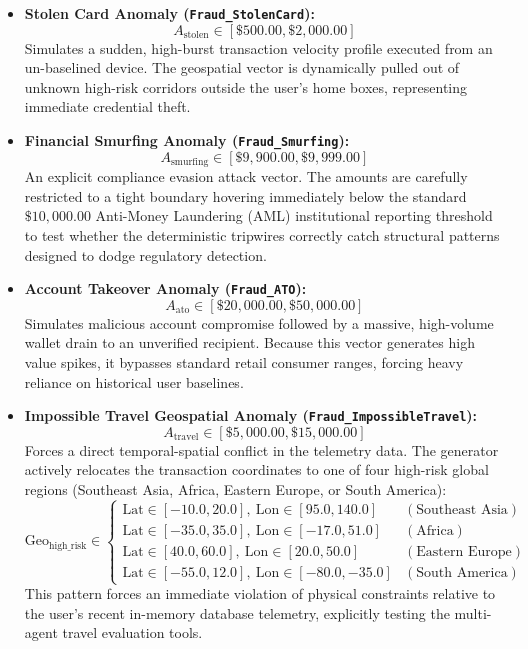 \documentclass[12pt]{report}
\begin{document}
\begin{itemize}
    \item \textbf{Stolen Card Anomaly (\texttt{Fraud\_StolenCard}):}
    $$
        A_{\text{stolen}} \in [\$500.00, \$2,000.00]
    $$
    Simulates a sudden, high-burst transaction velocity profile executed from an un-baselined device. The geospatial vector is dynamically pulled out of unknown high-risk corridors outside the user's home boxes, representing immediate credential theft.
    
    \item \textbf{Financial Smurfing Anomaly (\texttt{Fraud\_Smurfing}):}
    $$
        A_{\text{smurfing}} \in [\$9,900.00, \$9,999.00]
    $$
    An explicit compliance evasion attack vector. The amounts are carefully restricted to a tight boundary hovering immediately below the standard $\$10,000.00$ Anti-Money Laundering (AML) institutional reporting threshold to test whether the deterministic tripwires correctly catch structural patterns designed to dodge regulatory detection.
    
    \item \textbf{Account Takeover Anomaly (\texttt{Fraud\_ATO}):}
    $$
        A_{\text{ato}} \in [\$20,000.00, \$50,000.00]
    $$
    Simulates malicious account compromise followed by a massive, high-volume wallet drain to an unverified recipient. Because this vector generates high value spikes, it bypasses standard retail consumer ranges, forcing heavy reliance on historical user baselines.
    
    \item \textbf{Impossible Travel Geospatial Anomaly (\texttt{Fraud\_ImpossibleTravel}):}
    $$
        A_{\text{travel}} \in [\$5,000.00, \$15,000.00]
    $$
    Forces a direct temporal-spatial conflict in the telemetry data. The generator actively relocates the transaction coordinates to one of four high-risk global regions (Southeast Asia, Africa, Eastern Europe, or South America):
    $$
        \text{Geo}_{\text{high\_risk}} \in 
        \begin{cases}
            \text{Lat} \in [-10.0, 20.0], \ \text{Lon} \in [95.0, 140.0] & (\text{Southeast Asia}) \\
            \text{Lat} \in [-35.0, 35.0], \ \text{Lon} \in [-17.0, 51.0] & (\text{Africa}) \\
            \text{Lat} \in [40.0, 60.0], \ \text{Lon} \in [20.0, 50.0] & (\text{Eastern Europe}) \\
            \text{Lat} \in [-55.0, 12.0], \ \text{Lon} \in [-80.0, -35.0] & (\text{South America})
        \end{cases}
    $$
    This pattern forces an immediate violation of physical constraints relative to the user's recent in-memory database telemetry, explicitly testing the multi-agent travel evaluation tools.
\end{itemize}
\end{document}
